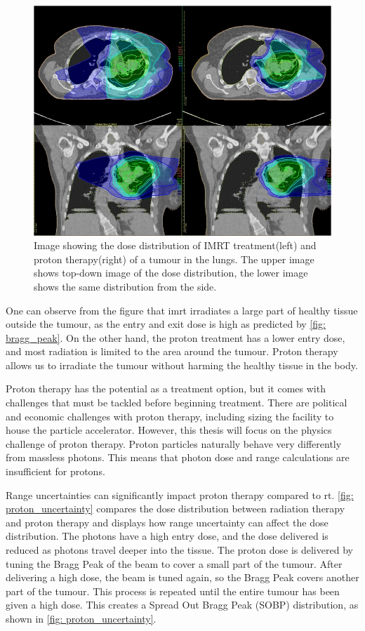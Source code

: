 \documentclass[main.tex]{subfiles}
\begin{document}
\begin{figure}[!htpb]
    \centering
    \includegraphics[width=12cm ]{images/proton_vs_imrt.png}
    \caption{Image showing the dose distribution of IMRT treatment(left) and proton therapy(right) of a tumour in the lungs\cite{protonimage}. The upper image shows top-down image of the dose distribution, the lower image shows the same distribution from the side. }
    \label{fig: imrt_vs_photon}
\end{figure}
\FloatBarrier

One can observe from the figure that \gls{imrt} irradiates a large part of healthy tissue outside the tumour, as the entry and exit dose is high as predicted by \autoref{fig: bragg_peak}. On the other hand, the proton treatment has a lower entry dose, and most radiation is limited to the area around the tumour. Proton therapy allows us to irradiate the tumour without harming the healthy tissue in the body.

Proton therapy has the potential as a treatment option, but it comes with challenges that must be tackled before beginning treatment. There are political and economic challenges with proton therapy, including sizing the facility to house the particle accelerator. However, this thesis will focus on the physics challenge of proton therapy. Proton particles naturally behave very differently from massless photons. This means that photon dose and range calculations are insufficient for protons.\cite{proton_challenges}

Range uncertainties can significantly impact proton therapy compared to \gls{rt}. \autoref{fig: proton_uncertainty} compares the dose distribution between radiation therapy and proton therapy and displays how range uncertainty can affect the dose distribution. The photons have a high entry dose, and the dose delivered is reduced as photons travel deeper into the tissue. The proton dose is delivered by tuning the Bragg Peak of the beam to cover a small part of the tumour. After delivering a high dose, the beam is tuned again, so the Bragg Peak covers another part of the tumour. This process is repeated until the entire tumour has been given a high dose. This creates a Spread Out Bragg Peak (SOBP) distribution, as shown in \autoref{fig: proton_uncertainty}.
\end{document}
